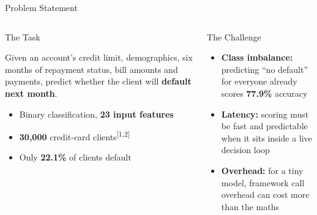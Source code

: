 \documentclass[aspectratio=169]{beamer}
\newcommand{\cit}[1]{\textsuperscript{\textcolor{accent}{[#1]}}}
\newenvironment{eq}[1]{\begin{minipage}[t][#1][t]{\linewidth}\raggedright\hyphenpenalty=10000 }{\end{minipage}}
\begin{document}
\begin{frame}{Problem Statement}
  \begin{columns}[T]
      \begin{block}{The Task}
\begin{eq}{4.2cm}
        \small
        Given an account's credit limit, demographics, six months of repayment
        status, bill amounts and payments, predict whether the client will
        \textbf{default next month}.
        \begin{itemize}
          \item Binary classification, \textbf{23 input features}
          \item \textbf{30,000} credit-card clients\cit{1,2}
          \item Only \textbf{22.1\%} of clients default
        \end{itemize}
      \end{eq}
      \end{block}
      \begin{alertblock}{The Challenge}
\begin{eq}{4.2cm}
        \small
        \begin{itemize}
          \item \textbf{Class imbalance:} predicting ``no default'' for everyone already
                scores \textbf{77.9\%} accuracy
          \item \textbf{Latency:} scoring must be fast and predictable when it
                sits inside a live decision loop
          \item \textbf{Overhead:} for a tiny model, framework call overhead can
                cost more than the maths
        \end{itemize}
      \end{eq}
      \end{alertblock}
  \end{columns}

  \vspace{0.05cm}
  \begin{center}
  \end{center}
\end{frame}
\end{document}
